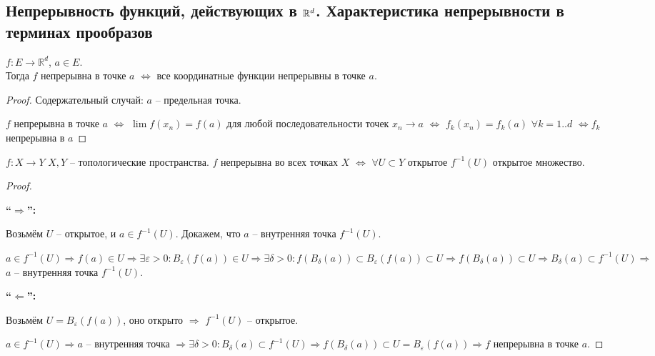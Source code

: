 
\subsection{Непрерывность функций, действующих в $\mathbb{R}^d$. Характеристика непрерывности в терминах прообразов \href{https://youtu.be/E7inz4tp-6k?t=1769}{\Walley}}


\begin{theorem-non}
\end{theorem-non}
$f : E \rightarrow \mathbb{R}^d$, $a \in E$. \\
Тогда $f$ непрерывна в точке $a$ $\Longleftrightarrow$ все координатные
функции непрерывны в точке $a$.

\begin{proof} Содержательный случай: $a$ -- предельная точка.

    $f$ непрерывна в точке $a$ $\Longleftrightarrow$ $\lim f(x_n) = f(a)$
    для любой последовательности точек $x_n \rightarrow a$
    $\Longleftrightarrow$ $f_k(x_n) = f_k(a) \,\, \forall k = 1..d$
    $\Longleftrightarrow f_k$ непрерывна в $a$

\end{proof}

\begin{theorem-non}
\end{theorem-non}

$f : X \rightarrow Y$ $X, Y$ -- топологические пространства.
$f$ непрерывна во всех точках $X$ $\Longleftrightarrow$
$\forall U \subset Y$ открытое $f^{-1}(U)$ открытое множество.

\begin{proof} $ $

    \textbf{``$\Longrightarrow$'':}

    Возьмём $U$ -- открытое, и $a \in f^{-1}(U)$.
    Докажем, что $a$ -- внутренняя точка $f^{-1}(U)$.
    
    $a \in f^{-1}(U) \Rightarrow f(a) \in U \Rightarrow \exists
    \varepsilon > 0 : B_{\varepsilon}(f(a)) \in U \Rightarrow
    \exists \delta > 0 : f(B_{\delta}(a)) \subset B_{\varepsilon}(f(a))
    \subset U \Rightarrow f(B_{\delta}(a)) \subset U \Rightarrow
    B_{\delta}(a) \subset f^{-1}(U) \Rightarrow$ $a$ -- внутренняя точка
    $f^{-1}(U)$.

    \textbf{``$\Longleftarrow$'':}

    Возьмём $U = B_\varepsilon (f(a))$, оно открыто $\Rightarrow$
    $f^{-1}(U)$ -- открытое.

    $a \in f^{-1}(U) \Rightarrow a$ -- внутренняя точка $\Rightarrow
    \exists \delta > 0 : B_{\delta}(a) \subset f^{-1}(U) \Rightarrow
    f(B_{\delta}(a)) \subset U = B_\varepsilon(f(a)) \Rightarrow f$
    непрерывна в точке $a$.
\end{proof}